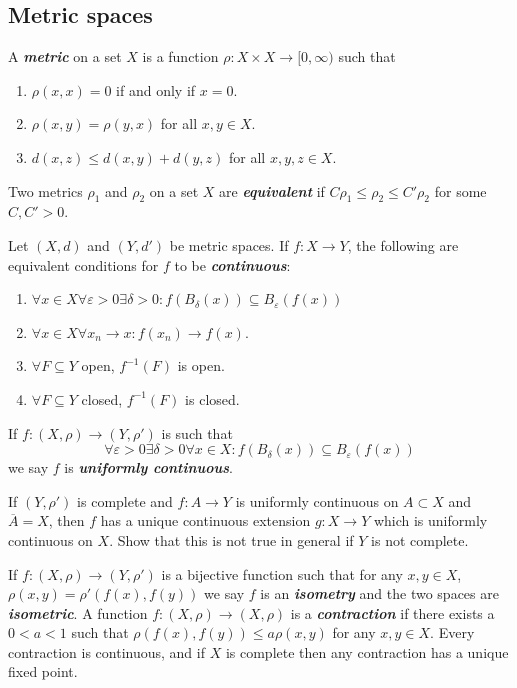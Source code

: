 \documentclass{article}
\theoremstyle{definition}
\numberwithin{equation}{section}
\begin{document}
	\subsection{Metric spaces}
	A \textbf{\textit{metric}} on a set $X$ is a function $\rho:X\times X\to [0,\infty)$ such that
	\begin{enumerate}
		\item $\rho(x,x)=0$ if and only if $x=0$.
		\item $\rho(x,y)=\rho(y,x)$ for all $x,y\in X$.
		\item $d(x,z)\leq d(x,y)+d(y,z)$ for all $x,y,z\in X$.
	\end{enumerate}
	Two metrics $\rho_1$ and $\rho_2$ on a set $X$ are \textbf{\textit{equivalent}} if $C\rho_1\leq\rho_2\leq C'\rho_2$ for some $C,C'>0$.
	
	\begin{thm}Let $(X,d)$ and $(Y,d')$ be metric spaces. If $f:X\to Y$, the following are equivalent conditions for $f$ to be \textbf{\textit{continuous}}:
		\begin{enumerate}
			\item $\forall x\in X\forall\varepsilon>0\exists\delta>0:f(B_\delta(x))\subseteq B_\varepsilon(f(x))$
			\item $\forall x\in X\forall x_n\to x:f(x_n)\to f(x)$.
			\item $\forall F\subseteq Y$ open, $f^{-1}(F)$ is open.
			\item $\forall F\subseteq Y$ closed, $f^{-1}(F)$ is closed.
		\end{enumerate}
	\end{thm}
	If $f:(X,\rho)\to(Y,\rho')$ is such that
	\[\forall\varepsilon>0\exists\delta>0\forall x\in X:f(B_\delta(x))\subseteq B_\varepsilon(f(x))\]
	we say $f$ is \textbf{\textit{uniformly continuous}}.
	\begin{exer*}
		If $(Y,\rho')$ is complete and $f:A\to Y$ is uniformly continuous on $A\subset X$ and $\overline{A}=X$, then $f$ has a unique continuous extension $g:X\to Y$ which is uniformly continuous on $X$. Show that this is not true in general if $Y$ is not complete.
	\end{exer*}
	If $f:(X,\rho)\to(Y,\rho')$ is a bijective function such that for any $x,y\in X$, $\rho(x,y)=\rho'(f(x),f(y))$ we say $f$ is an \textbf{\textit{isometry}} and the two spaces are \textbf{\textit{isometric}}. A function $f:(X,\rho)\to (X,\rho)$ is a \textbf{\textit{contraction}} if there exists a $0<a<1$ such that $\rho(f(x),f(y))\leq a\rho(x,y)$ for any $x,y\in X$. Every contraction is continuous, and if $X$ is complete then any contraction has a unique fixed point.
	
\end{document}
